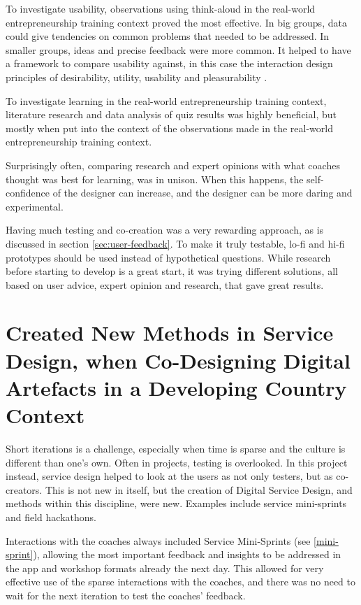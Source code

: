 To investigate usability, observations using think-aloud in the real-world entrepreneurship training context proved the most effective. In big groups, data could give tendencies on common problems that needed to be addressed. In smaller groups, ideas and precise feedback were more common. It helped to have a framework to compare usability against, in this case the interaction design principles of desirability, utility, usability and pleasurability \citep{clatworthy}.

To investigate learning in the real-world entrepreneurship training context, literature research and data analysis of quiz results was highly beneficial, but mostly when put into the context of the observations made in the real-world entrepreneurship training context.

Surprisingly often, comparing research and expert opinions with what coaches thought was best for learning, was in unison. When this happens, the self-confidence of the designer can increase, and the designer can be more daring and experimental.

Having much testing and co-creation was a very rewarding approach, as is discussed in section \ref{sec:user-feedback}. To make it truly testable, lo-fi and hi-fi prototypes should be used instead of hypothetical questions. While research before starting to develop is a great start, it was trying different solutions, all based on user advice, expert opinion and research, that gave great results.

\section{Created New Methods in Service Design, when Co-Designing Digital Artefacts in a Developing Country Context}
Short iterations is a challenge, especially when time is sparse and the culture is different than one's own. Often in projects, testing is overlooked. In this project instead, service design helped to look at the users as not only testers, but as co-creators. This is not new in itself, but the creation of Digital Service Design, and methods within this discipline, were new. Examples include service mini-sprints and field hackathons.

Interactions with the coaches always included Service Mini-Sprints (see \ref{mini-sprint}), allowing the most important feedback and insights to be addressed in the app and workshop formats already the next day. This allowed for very effective use of the sparse interactions with the coaches, and there was no need to wait for the next iteration to test the coaches' feedback.


